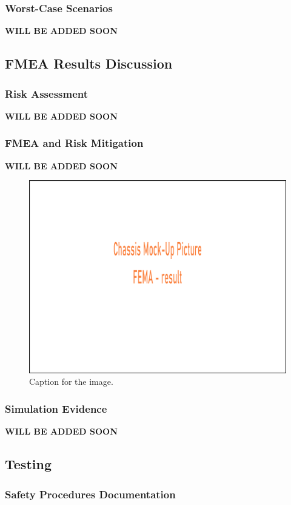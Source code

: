 \subsubsection{Worst-Case Scenarios}
\textbf{WILL BE ADDED SOON}
\subsection{FMEA Results Discussion}
\subsubsection{Risk Assessment}
\textbf{WILL BE ADDED SOON}
\subsubsection{FMEA and Risk Mitigation}
\textbf{WILL BE ADDED SOON}

\begin{figure}[ht]
  \centering
  \includegraphics[width=\linewidth]{texfiles/mech/updated/chassis/fmea1.png}
  \caption{Caption for the image.}
  \label{fig:image1}
\end{figure}

\subsubsection{Simulation Evidence}
\textbf{WILL BE ADDED SOON}


\subsection{Testing}
\subsubsection{Safety Procedures Documentation}



